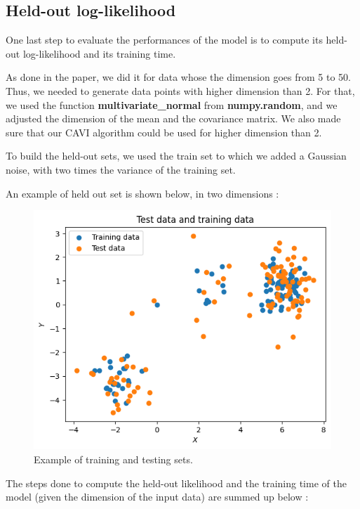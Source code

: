 \documentclass{article}
\begin{document}
\subsection{Held-out log-likelihood}
One last step to evaluate the performances of the model is to compute its held-out log-likelihood and its training time.

As done in the paper, we did it for data whose the dimension goes from 5 to 50. Thus, we needed to generate data points with higher dimension than 2. For that, we used the function \textbf{multivariate\_normal} from \textbf{numpy.random}, and we adjusted the dimension of the mean and the covariance matrix. We also made sure that our CAVI algorithm could be used for higher dimension than 2.

To build the held-out sets, we used the train set to which we added a Gaussian noise, with two times the variance of the training set.

An example of held out set is shown below, in two dimensions :

\begin{figure}[H]
    \centering
    \includegraphics[scale=0.4]{images/held-out_set.png}
    \caption{Example of training and testing sets.}
\end{figure}


The steps done to compute the held-out likelihood and the training time of the model (given the dimension of the input data) are summed up below :
\end{document}
